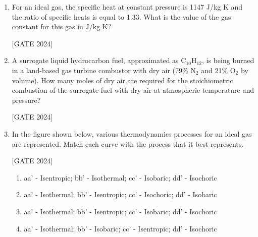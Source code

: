 \documentclass[journal,12pt,onecolumn]{IEEEtran}
\theoremstyle{remark}
\begin{document}
\begin{enumerate}
    \item For an ideal gas, the specific heat at constant pressure is 1147 J/kg K and the ratio of specific heats is equal to 1.33. What is the value of the gas constant for this gas in J/kg K?
   
        \hfill{[GATE 2024]}\begin{enumerate} 
 \end{enumerate}
    
    \item A surrogate liquid hydrocarbon fuel, approximated as C$_{10}$H$_{12}$, is being burned in a land-based gas turbine combustor with dry air (79\% N$_2$ and 21\% O$_2$ by volume). How many moles of dry air are required for the stoichiometric combustion of the surrogate fuel with dry air at atmospheric temperature and pressure?
   
        \hfill{[GATE 2024]}\begin{enumerate}    \end{enumerate}
    

    \item In the figure shown below, various thermodynamics processes for an ideal gas are represented. Match each curve with the process that it best represents.
    
   
        \hfill{[GATE 2024]}\begin{enumerate}
            \item aa' - Isentropic; bb' - Isothermal; cc' - Isobaric; dd' - Isochoric
            \item aa' - Isothermal; bb' - Isentropic; cc' - Isochoric; dd' - Isobaric
            \item aa' - Isothermal; bb' - Isentropic; cc' - Isobaric; dd' - Isochoric
            \item aa' - Isothermal; bb' - Isobaric; cc' - Isentropic; dd' - Isochoric
        \end{enumerate}
   


\end{enumerate}
\end{document}
